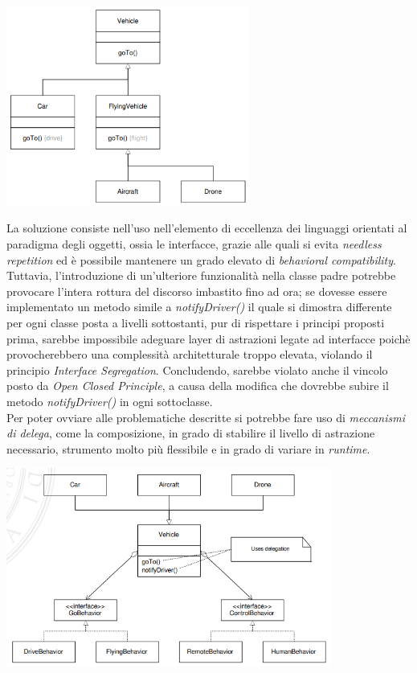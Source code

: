 \documentclass{article}
\begin{document}
\begin{center}
    \includegraphics*[width=0.6\textwidth]{foto 2.png}
\end{center}
La soluzione consiste nell'uso nell'elemento di eccellenza dei linguaggi orientati al paradigma degli oggetti, ossia le interfacce, grazie alle quali si evita \textit{needless repetition} ed è possibile mantenere un grado elevato di \textit{behavioral compatibility}. Tuttavia, l'introduzione di un'ulteriore funzionalità nella classe padre potrebbe provocare l'intera rottura del discorso imbastito fino ad ora; se dovesse essere implementato un metodo simile a \textit{notifyDriver()} il quale si dimostra differente per ogni classe posta a livelli sottostanti, pur di rispettare i principi proposti prima, sarebbe impossibile adeguare layer di astrazioni legate ad interfacce poichè provocherebbero una complessità architetturale troppo elevata, violando il principio \textit{Interface Segregation}. Concludendo, sarebbe violato anche il vincolo posto da \textit{Open Closed Principle}, a causa della modifica che dovrebbe subire il metodo \textit{notifyDriver()} in ogni sottoclasse.\vspace*{14pt}\\
Per poter ovviare alle problematiche descritte si potrebbe fare uso di \textit{meccanismi di delega}, come la composizione, in grado di stabilire il livello di astrazione necessario, strumento molto più flessibile e in grado di variare in \textit{runtime}.\vspace*{7pt}   
\begin{center}
    \includegraphics*[width=0.8\textwidth]{foto 3.png}
\end{center}
\end{document}
